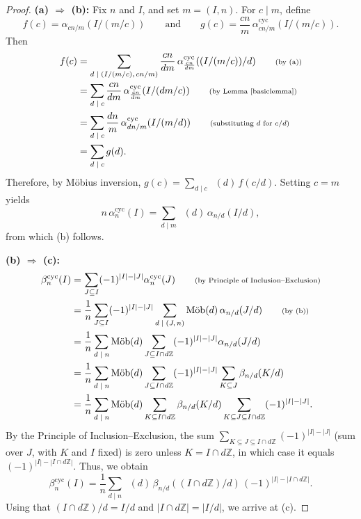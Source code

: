 \documentclass[12pt]{article}
\newcommand{\since}[1]{\tag*{\scriptsize{(#1)}}}
\newcommand{\alphacyc}{\alpha^{\text{cyc}}}
\newcommand{\betacyc}{\beta^{\text{cyc}}}
\DeclareMathOperator{\mob}{M\ddot{o}b}
\theoremstyle{definition}
\begin{document}
\begin{proof} \textbf{(a) $\Rightarrow$ (b): } Fix $n$ and $I$, and set $m = (I,n)$. For $c \mid m$, define
\[ f(c) = \alpha_{cn/m}(I/(m/c)) \qquad \text{and} \qquad g(c) = \frac{cn}{m}\,\alphacyc_{cn/m}(I/(m/c)). \]
Then
\begin{align*} f(c) &= \sum_{\text{$d \mid (I/(m/c), cn/m)$}} \frac{cn}{dm}\,\alphacyc_{\frac{cn}{dm}}((I/(m/c))/d) \since{by (a)} \\
&= \sum_{\text{$d \mid c$}} \frac{cn}{dm}\,\alphacyc_{\frac{cn}{dm}}(I/(dm/c)) \since{by Lemma \ref{basiclemma}} \\
&= \sum_{\text{$d \mid c$}} \frac{dn}{m}\,\alphacyc_{dn/m}(I/(m/d)) \since{substituting $d$ for $c/d$} \\
&= \sum_{\text{$d \mid c$}} g(d).
\end{align*}
Therefore, by M\"obius inversion, $g(c) = \sum_{\text{$d \mid c$}} \mob(d)\,f(c/d)$. Setting $c = m$ yields
\[ n\,\alphacyc_n(I) = \sum_{\text{$d \mid m$}} \mob(d)\,\alpha_{n/d}(I/d), \]
from which (b) follows.

\smallskip

\noindent\textbf{(b) $\Rightarrow$ (c): }
\begin{align*}
\betacyc_n(I) &= \sum_{J \subseteq I} (-1)^{|I|-|J|} \alphacyc_n(J) \since{by Principle of Inclusion--Exclusion} \\
&= \frac{1}{n}\sum_{J \subseteq I} (-1)^{|I|-|J|} \sum_{\text{$d \mid (J,n)$}} \mob(d)\,\alpha_{n/d}(J/d) \since{by (b)} \\
&= \frac{1}{n}\sum_{\text{$d \mid n$}} \mob(d)\sum_{J \subseteq I \cap d\mathbb{Z}} (-1)^{|I|-|J|}\alpha_{n/d}(J/d) \\
&= \frac{1}{n}\sum_{\text{$d \mid n$}} \mob(d)\sum_{J \subseteq I \cap d\mathbb{Z}} (-1)^{|I|-|J|}\sum_{K \subseteq J} \beta_{n/d}(K/d) \\
&= \frac{1}{n}\sum_{\text{$d \mid n$}} \mob(d)\sum_{K \subseteq I \cap d\mathbb{Z}} \beta_{n/d}(K/d) \sum_{K \subseteq J \subseteq I \cap d\mathbb{Z}} (-1)^{|I|-|J|}.
\end{align*}
By the Principle of Inclusion--Exclusion, the sum $\sum_{K \subseteq J \subseteq I \cap d\mathbb{Z}} (-1)^{|I|-|J|}$ (sum over $J$, with $K$ and $I$ fixed) is zero unless $K = I \cap d\mathbb{Z}$, in which case it equals $(-1)^{|I|-|I \cap d\mathbb{Z}|}$. Thus, we obtain
\[ \betacyc_n(I) =\frac{1}{n}\sum_{\text{$d \mid n$}} \mob(d)\,\beta_{n/d}((I\cap d\mathbb{Z})/d)\,(-1)^{|I|-|I \cap d\mathbb{Z}|}. \]
Using that $(I\cap d\mathbb{Z})/d = I/d$ and $|I\cap d\mathbb{Z}| = |I/d|$, we arrive at (c).


\end{proof}
\end{document}
